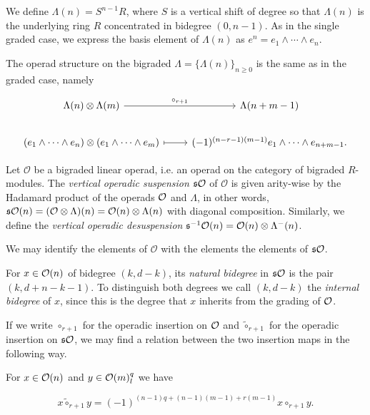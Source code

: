 \documentclass[Thesis.tex]{subfiles}
\begin{document}
We define $\Lambda(n)=S^{n-1}R$, where  $S$ is a vertical shift of degree so that $\Lambda(n)$ is the underlying ring $R$ concentrated in bidegree  $(0,n-1)$. As in the single graded case, we express the basis element of $\Lambda(n)$ as $e^n=e_1\land\cdots\land e_n$.

The operad structure on the bigraded $\Lambda=\{\Lambda(n)\}_{n\geq 0}$ is the same as in the graded case, namely

\[
\begin{tikzcd}
\Lambda(n)\otimes\Lambda(m) \arrow[r, "\circ_{r+1}"] & \Lambda(n+m-1)\\
(e_1\land\cdots\land e_n)\otimes(e_1\land\cdots\land e_m)\arrow[r, mapsto] & (-1)^{(n-r-1)(m-1)}e_1\land\cdots\land e_{n+m-1}.
\end{tikzcd}
\]


\begin{defin}
Let $\mathcal{O}$ be a bigraded linear operad, i.e. an operad on the category of bigraded $R$-modules. The \emph{vertical operadic suspension} $\mathfrak{s}{\mathcal O}$ of $\mathcal{O}$ is given arity-wise by the Hadamard product of the operads ${\mathcal O}$ and $\Lambda$, in other words, $\mathfrak{s}{\mathcal O}(n)=(\mathcal{O}\otimes\Lambda)(n)=\mathcal{O}(n)\otimes\Lambda(n)$ with diagonal composition. Similarly, we define the \emph{vertical operadic desuspension} $\mathfrak{s}^{-1}{\mathcal O}(n)=\mathcal{O}(n)\otimes\Lambda^-(n)$.
\end{defin}


We may identify the elements of $\mathcal{O}$ with the elements the elements of $\mathfrak{s}{\mathcal O}$. 
\begin{defin}
For $x\in{\mathcal O}(n)$ of bidegree $(k,d-k)$, its \emph{natural bidegree} in $\mathfrak{s}{\mathcal O}$ is the pair $(k,d+n-k-1)$. To distinguish both degrees we call $(k,d-k)$ the \emph{internal bidegree} of $x$, since this is the degree that $x$ inherits from the grading of ${\mathcal O}$. 
\end{defin}

If we write $\circ_{r+1}$ for the operadic insertion on ${\mathcal O}$ and $\tilde{\circ}_{r+1}$ for the operadic insertion on $\mathfrak{s}{\mathcal O}$, we may find a relation between the two insertion maps in the following way. 

\begin{lem}
For $x\in{\mathcal O}(n)$ and $y\in{\mathcal O}(m)^{q}_l$ we have

\begin{equation}\label{sign}
x\tilde{\circ}_{r+1}y=(-1)^{(n-1)q+(n-1)(m-1)+r(m-1)}x\circ_{r+1} y.
\end{equation}

\end{lem}
\end{document}
